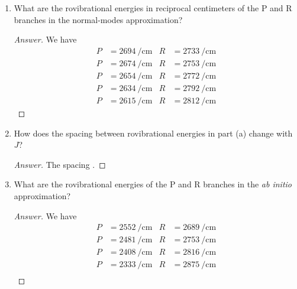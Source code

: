 \documentclass[../psets.tex]{subfiles}
\begin{document}
\begin{enumerate}
    \begin{enumerate}
        \item What are the rovibrational energies in reciprocal centimeters of the P and R branches in the normal-modes approximation?
        \begin{proof}[Answer]
            We have
            \begin{align*}
                P &= \SI{2694}{\per\centi\meter}&
                    R &= \SI{2733}{\per\centi\meter}\\
                P &= \SI{2674}{\per\centi\meter}&
                    R &= \SI{2753}{\per\centi\meter}\\
                P &= \SI{2654}{\per\centi\meter}&
                    R &= \SI{2772}{\per\centi\meter}\\
                P &= \SI{2634}{\per\centi\meter}&
                    R &= \SI{2792}{\per\centi\meter}\\
                P &= \SI{2615}{\per\centi\meter}&
                    R &= \SI{2812}{\per\centi\meter}
            \end{align*}
        \end{proof}
        \item How does the spacing between rovibrational energies in part (a) change with $J$?
        \begin{proof}[Answer]
            The spacing .
        \end{proof}
        \item What are the rovibrational energies of the P and R branches in the \emph{ab initio} approximation?
        \begin{proof}[Answer]
            We have
            \begin{align*}
                P &= \SI{2552}{\per\centi\meter}&
                    R &= \SI{2689}{\per\centi\meter}\\
                P &= \SI{2481}{\per\centi\meter}&
                    R &= \SI{2753}{\per\centi\meter}\\
                P &= \SI{2408}{\per\centi\meter}&
                    R &= \SI{2816}{\per\centi\meter}\\
                P &= \SI{2333}{\per\centi\meter}&
                    R &= \SI{2875}{\per\centi\meter}\\

\end{align*}
\end{proof}
\end{enumerate}
\end{enumerate}
\end{document}
